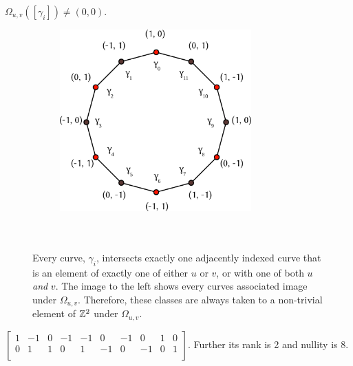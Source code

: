 \documentclass[a4paper, 11pt]{article}
\begin{document}
\begin{lem}
$\Omega_{u,v}([\gamma_i])\neq (0,0)$.
\begin{figure}[H]
\begin{figure}
\includegraphics[width=2.9in]{12gon.png}
\end{figure}
~\\\vspace{0.5in}\\Every curve, $\gamma_i$, intersects exactly one adjacently indexed curve that is an element of exactly one of either $u$ or $v$, or with one of both $u$ \emph{and} $v$. The image to the left shows every curves associated image under $\Omega_{u,v}$. Therefore, these classes are always taken to a non-trivial element of $\mathbb{Z}^2$ under $\Omega_{u,v}$.
\end{figure}

\end{lem}
\vspace{0.8in}

\begin{lem}
$\left[\begin{matrix}
1 & -1 & 0 & -1 & -1 & 0 & -1 & 0 & 1 & 0\\
0 & 1 & 1 & 0 & 1 & -1 & 0 & -1 & 0 & 1\\
\end{matrix}\right]$. Further its rank is 2 and nullity is 8.
\end{lem}
\end{document}
